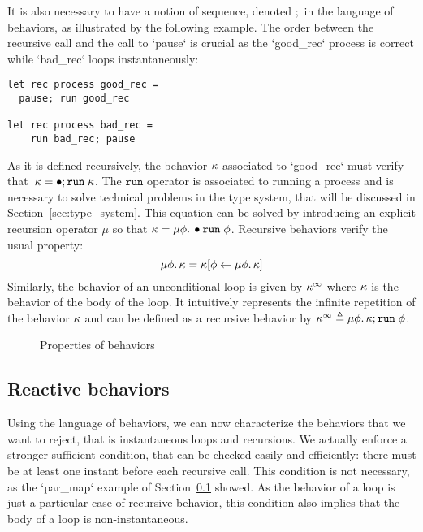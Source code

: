 \documentclass[9pt,preprint]{sigplanconf}
\newcommand{\deq}{\triangleq}
\begin{document}
It is also necessary to have a notion of sequence, denoted $;$ in the language of behaviors, as illustrated by the following example. The order between the recursive call and the call to `pause` is crucial as the `good_rec` process is correct while `bad_rec` loops instantaneously:
\begin{lstlisting}
let rec process good_rec =
  pause; run good_rec

let rec process bad_rec =
    run bad_rec; pause
\end{lstlisting}
As it is defined recursively, the behavior  $\kappa$  associated to `good_rec` must verify that~$ \kappa = \bullet ; \mathtt{run}\; \kappa$. The $\mathtt{run}$ operator is associated to running a process and is necessary to solve technical problems in the type system, that will be discussed in Section~\ref{sec:type_system}. This equation can be solved by introducing an explicit recursion operator $\mu$ so that $\kappa = \mu \phi.\, \bullet{\mathtt{run}\; \phi}$. Recursive behaviors verify the usual property:
\[ \mu \phi.\, \kappa = \kappa[\phi \leftarrow \mu \phi.\, \kappa] \]
 Similarly, the behavior of an unconditional loop is given by $\kappa^\infty$ where $\kappa$ is the behavior of the body of the loop. It intuitively represents the infinite repetition of the behavior $\kappa$ and can be defined as a recursive behavior by $\effinf{\rk} \deq \effrec{\effvar}{\effcon{\rk}{\effrun{\effvar}}}$. 

\begin{figure}[t]



\caption{Properties of behaviors}
\end{figure}


\subsection{Reactive behaviors}

Using the language of behaviors, we can now characterize the behaviors that we want to reject, that is instantaneous loops and recursions. We actually enforce a stronger sufficient condition, that can be checked easily and efficiently: there must be at least one instant before each recursive call. This condition is not necessary, as the `par_map` example of Section~\ref{} showed. As the behavior of a loop is just a particular case of recursive behavior, this condition also implies that the body of a loop is non-instantaneous.
\end{document}
